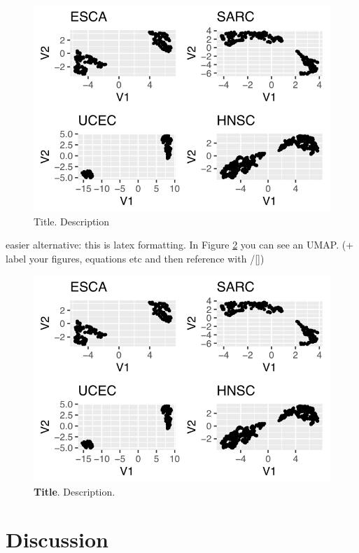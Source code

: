 \documentclass[
  parskip,
  oneside]{scrreprt}
\begin{document}
\begin{figure}
\includegraphics[width=9.44in]{figures/figure1} \caption{Title. Description}\label{fig:figure1}
\end{figure}

easier alternative: this is latex formatting. In Figure \ref{figure1}
you can see an UMAP. (+ label your figures, equations etc and then
reference with /\ref{})

\begin{figure}[htbp]
    \centering
    \includegraphics{figures/figure1.png}
    \caption[\textbf{Title}.]{\textbf{Title}. Description.}
    \label{figure1}
\end{figure}

\hypertarget{discussion}{%
\chapter{Discussion}\label{discussion}}
\end{document}
